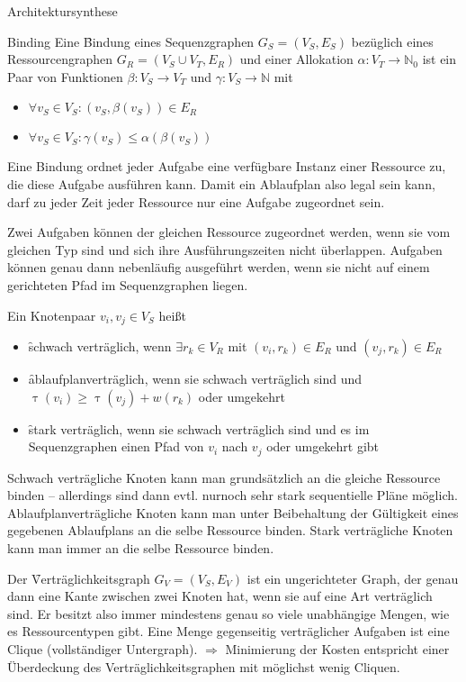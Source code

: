 \begin{chapter}{Architektursynthese}
\begin{section}{Binding}
 Eine \f{Bindung} eines Sequenzgraphen $G_S = (V_S,E_S)$ bezüglich eines Ressourcengraphen $G_R = (V_S \cup V_T, E_R)$ und einer Allokation $\alpha: V_T\rightarrow \mathbb{N}_0$ ist ein Paar von Funktionen $\beta: V_S\rightarrow V_T$ und $\gamma:V_S\rightarrow \mathbb{N}$ mit 
 \begin{itemize}
  \item $\forall v_S \in V_S: (v_S, \beta(v_S)) \in E_R$
  \item $\forall v_S \in V_S: \gamma(v_S)\leq \alpha(\beta(v_S))$
 \end{itemize}
 Eine Bindung ordnet jeder Aufgabe eine verfügbare Instanz einer Ressource zu, die diese Aufgabe ausführen kann. Damit ein Ablaufplan also legal sein kann, darf zu jeder Zeit jeder Ressource nur eine Aufgabe zugeordnet sein.
 
 Zwei Aufgaben können der gleichen Ressource zugeordnet werden, wenn sie vom gleichen Typ sind und sich ihre Ausführungszeiten nicht überlappen. Aufgaben können genau dann nebenläufig ausgeführt werden, wenn sie nicht auf einem gerichteten Pfad im Sequenzgraphen liegen.
 
 Ein Knotenpaar $v_i,v_j\in V_S$ heißt
 \begin{itemize}
  \item \f{schwach verträglich}, wenn $\exists r_k\in V_R$ mit $(v_i,r_k)\in E_R$ und $(v_j,r_k)\in E_R$
  \item \f{ablaufplanverträglich}, wenn sie schwach verträglich sind und $\uptau(v_i) \geq \uptau(v_j)+w(r_k)$ oder umgekehrt
  \item \f{stark verträglich}, wenn sie schwach verträglich sind und es im Sequenzgraphen einen Pfad von $v_i$ nach $v_j$ oder umgekehrt gibt
 \end{itemize}
 
 Schwach verträgliche Knoten kann man grundsätzlich an die gleiche Ressource binden -- allerdings sind dann evtl. nurnoch sehr stark sequentielle Pläne möglich. Ablaufplanverträgliche Knoten kann man unter Beibehaltung der Gültigkeit eines gegebenen Ablaufplans an die selbe Ressource binden. Stark verträgliche Knoten kann man immer an die selbe Ressource binden.
 
 Der \f{Verträglichkeitsgraph} $G_V=(V_S,E_V)$ ist ein ungerichteter Graph, der genau dann eine Kante zwischen zwei Knoten hat, wenn sie auf eine Art verträglich sind. Er besitzt also immer mindestens genau so viele unabhängige Mengen, wie es Ressourcentypen gibt. Eine Menge gegenseitig verträglicher Aufgaben ist eine Clique (vollständiger Untergraph). $\Rightarrow$ Minimierung der Kosten entspricht einer Überdeckung des Verträglichkeitsgraphen mit möglichst wenig Cliquen.
 

\end{section}
\end{chapter}
